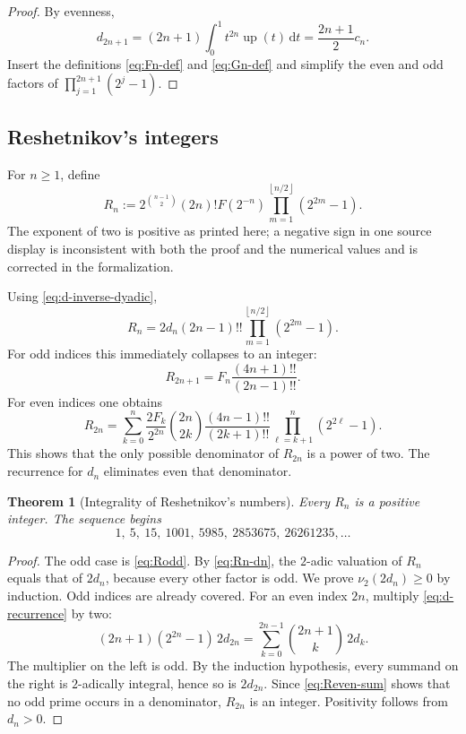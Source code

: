 \documentclass[11pt]{article}
\numberwithin{equation}{section}
\newtheorem{theorem}{Theorem}[section]
\theoremstyle{definition}
\theoremstyle{remark}
\newcommand{\upf}{\operatorname{up}}
\newcommand{\dd}{\,\mathrm d}
\newcommand{\floor}[1]{\left\lfloor#1\right\rfloor}
\begin{document}
\begin{proof}
By evenness,
\[
 d_{2n+1}=(2n+1)\int_0^1t^{2n}\upf(t)\dd t
 =\frac{2n+1}{2}c_n.
\]
Insert the definitions \eqref{eq:Fn-def} and \eqref{eq:Gn-def} and simplify the even and odd factors of $\prod_{j=1}^{2n+1}(2^j-1)$.
\end{proof}

\subsection{Reshetnikov's integers}

For $n\ge1$, define
\begin{equation}\label{eq:Rn-def}
 R_n:=2^{\binom{n-1}{2}}(2n)!F(2^{-n})
       \prod_{m=1}^{\floor{n/2}}(2^{2m}-1).
\end{equation}
The exponent of two is positive as printed here; a negative sign in one source display is inconsistent with both the proof and the numerical values and is corrected in the formalization.

Using \eqref{eq:d-inverse-dyadic},
\begin{equation}\label{eq:Rn-dn}
 R_n=2d_n(2n-1)!!\prod_{m=1}^{\floor{n/2}}(2^{2m}-1).
\end{equation}
For odd indices this immediately collapses to an integer:
\begin{equation}\label{eq:Rodd}
 R_{2n+1}=F_n\frac{(4n+1)!!}{(2n-1)!!}.
\end{equation}
For even indices one obtains
\begin{equation}\label{eq:Reven-sum}
 R_{2n}=\sum_{k=0}^{n}\frac{2F_k}{2^{2n}}\binom{2n}{2k}
 \frac{(4n-1)!!}{(2k+1)!!}
 \prod_{\ell=k+1}^{n}(2^{2\ell}-1).
\end{equation}
This shows that the only possible denominator of $R_{2n}$ is a power of two.  The recurrence for $d_n$ eliminates even that denominator.

\begin{theorem}[Integrality of Reshetnikov's numbers]\label{thm:Rn-integral}
Every $R_n$ is a positive integer.  The sequence begins
\begin{equation}\label{eq:Rn-values}
 1,\ 5,\ 15,\ 1001,\ 5985,\ 2853675,\ 26261235,\ldots
\end{equation}
\end{theorem}

\begin{proof}
The odd case is \eqref{eq:Rodd}.  By \eqref{eq:Rn-dn}, the $2$-adic valuation of $R_n$ equals that of $2d_n$, because every other factor is odd.  We prove $\nu_2(2d_n)\ge0$ by induction.  Odd indices are already covered.  For an even index $2n$, multiply \eqref{eq:d-recurrence} by two:
\begin{equation}\label{eq:even-d-recurrence}
 (2n+1)(2^{2n}-1)\,2d_{2n}
 =\sum_{k=0}^{2n-1}\binom{2n+1}{k}\,2d_k.
\end{equation}
The multiplier on the left is odd.  By the induction hypothesis, every summand on the right is $2$-adically integral, hence so is $2d_{2n}$.  Since \eqref{eq:Reven-sum} shows that no odd prime occurs in a denominator, $R_{2n}$ is an integer.  Positivity follows from $d_n>0$.
\end{proof}
\end{document}
